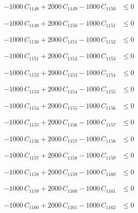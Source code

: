 \documentclass[a4paper,11pt]{article}
\begin{document}
\begin{align}
-1000\,C_{1148} + 2000\,C_{1149} - 1000\,C_{1150} &\leq 0 \nonumber
\end{align}

\begin{align}
-1000\,C_{1149} + 2000\,C_{1150} - 1000\,C_{1151} &\leq 0 \nonumber
\end{align}

\begin{align}
-1000\,C_{1150} + 2000\,C_{1151} - 1000\,C_{1152} &\leq 0 \nonumber
\end{align}

\begin{align}
-1000\,C_{1151} + 2000\,C_{1152} - 1000\,C_{1153} &\leq 0 \nonumber
\end{align}

\begin{align}
-1000\,C_{1152} + 2000\,C_{1153} - 1000\,C_{1154} &\leq 0 \nonumber
\end{align}

\begin{align}
-1000\,C_{1153} + 2000\,C_{1154} - 1000\,C_{1155} &\leq 0 \nonumber
\end{align}

\begin{align}
-1000\,C_{1154} + 2000\,C_{1155} - 1000\,C_{1156} &\leq 0 \nonumber
\end{align}

\begin{align}
-1000\,C_{1155} + 2000\,C_{1156} - 1000\,C_{1157} &\leq 0 \nonumber
\end{align}

\begin{align}
-1000\,C_{1156} + 2000\,C_{1157} - 1000\,C_{1158} &\leq 0 \nonumber
\end{align}

\begin{align}
-1000\,C_{1157} + 2000\,C_{1158} - 1000\,C_{1159} &\leq 0 \nonumber
\end{align}

\begin{align}
-1000\,C_{1158} + 2000\,C_{1159} - 1000\,C_{1160} &\leq 0 \nonumber
\end{align}

\begin{align}
-1000\,C_{1159} + 2000\,C_{1160} - 1000\,C_{1161} &\leq 0 \nonumber
\end{align}

\begin{align}
-1000\,C_{1160} + 2000\,C_{1161} - 1000\,C_{1162} &\leq 0 \nonumber
\end{align}
\end{document}
